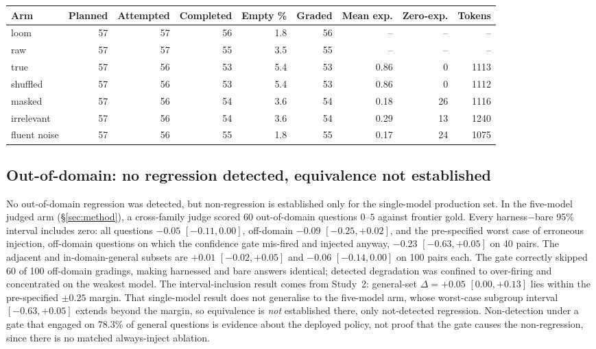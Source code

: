 \documentclass[10pt,twocolumn]{article}
\begin{document}
\begin{table}[t]
\vspace{8pt}
\begin{tabular}{lrrrrrrrr}
\toprule
Arm & Planned & Attempted & Completed & Empty \% & Graded & Mean exp. & Zero-exp. & Tokens \\
\midrule
loom         & 57 & 57 & 56 & 1.8 & 56 & -- & -- & -- \\
raw          & 57 & 57 & 55 & 3.5 & 55 & -- & -- & -- \\
true         & 57 & 56 & 53 & 5.4 & 53 & 0.86 & 0  & 1113 \\
shuffled     & 57 & 56 & 53 & 5.4 & 53 & 0.86 & 0  & 1112 \\
masked       & 57 & 56 & 54 & 3.6 & 54 & 0.18 & 26 & 1116 \\
irrelevant   & 57 & 56 & 54 & 3.6 & 54 & 0.29 & 13 & 1240 \\
fluent noise & 57 & 56 & 55 & 1.8 & 55 & 0.17 & 24 & 1075 \\
\bottomrule
\end{tabular}
\end{table}

\subsection{Out-of-domain: no regression detected, equivalence not established}\label{sec:ood}
No out-of-domain regression was detected, but non-regression is established only for the single-model production set. In the five-model judged arm (\S\ref{sec:method}), a cross-family judge scored 60 out-of-domain questions $0$--$5$ against frontier gold. Every harness$-$bare 95\% interval includes zero: all questions $-0.05$ $[-0.11,0.00]$, off-domain $-0.09$ $[-0.25,+0.02]$, and the pre-specified worst case of erroneous injection, off-domain questions on which the confidence gate mis-fired and injected anyway, $-0.23$ $[-0.63,+0.05]$ on 40 pairs. The adjacent and in-domain-general subsets are $+0.01$ $[-0.02,+0.05]$ and $-0.06$ $[-0.14,0.00]$ on 100 pairs each. The gate correctly skipped 60 of 100 off-domain gradings, making harnessed and bare answers identical; detected degradation was confined to over-firing and concentrated on the weakest model. The interval-inclusion result comes from Study~2: general-set $\Delta=+0.05$ $[0.00,+0.13]$ lies within the pre-specified $\pm0.25$ margin. That single-model result does not generalise to the five-model arm, whose worst-case subgroup interval $[-0.63,+0.05]$ extends beyond the margin, so equivalence is \emph{not} established there, only not-detected regression. Non-detection under a gate that engaged on $78.3\%$ of general questions is evidence about the deployed policy, not proof that the gate causes the non-regression, since there is no matched always-inject ablation.
\end{document}
